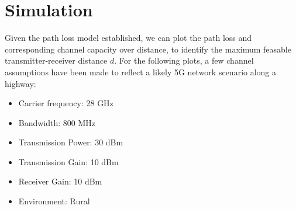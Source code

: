 \graphicspath{{figures/}}


                       
\chapter{Simulation}
\label{chap:simulation}

Given the path loss model established, we can plot the path loss and corresponding channel capacity over distance,
to identify the maximum feasable transmitter-receiver distance $d$. For the following plots, 
a few channel assumptions have been made to reflect a likely 5G network scenario along a highway: 

\begin{center}
\begin{itemize}
    \item Carrier frequency: 28 GHz
    \item Bandwidth: 800 MHz
    \item Transmission Power: 30 dBm
    \item Transmission Gain: 10 dBm
    \item Receiver Gain: 10 dBm
    \item Environment: Rural
\end{itemize}
\end{center}

